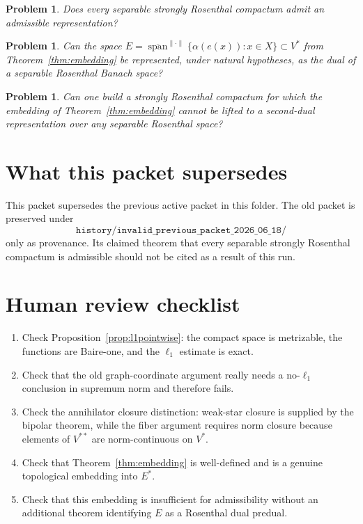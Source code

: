 \documentclass[11pt]{article}
\newtheorem{problem}[theorem]{Problem}
\newcommand{\spancl}{\overline{\operatorname{span}}}
\newcommand{\norm}[1]{\lVert #1\rVert}
\begin{document}
\begin{problem}
Does every separable strongly Rosenthal compactum admit an admissible
representation?
\end{problem}

\begin{problem}
Can the space \(E=\spancl^{\norm{\cdot}}\{\alpha(e(x)):x\in X\}\subset V^*\)
from Theorem~\ref{thm:embedding} be represented, under natural hypotheses, as
the dual of a separable Rosenthal Banach space?
\end{problem}

\begin{problem}
Can one build a strongly Rosenthal compactum for which the embedding of
Theorem~\ref{thm:embedding} cannot be lifted to a second-dual representation
over any separable Rosenthal space?
\end{problem}

\section{What this packet supersedes}

This packet supersedes the previous active packet in this folder.  The old
packet is preserved under
\[
 \texttt{history/invalid\_previous\_packet\_2026\_06\_18/}
\]
only as provenance.  Its claimed theorem that every separable strongly
Rosenthal compactum is admissible should not be cited as a result of this run.

\section{Human review checklist}

\begin{enumerate}[leftmargin=2em]
\item Check Proposition~\ref{prop:l1pointwise}: the compact space is metrizable,
      the functions are Baire-one, and the \(\ell_1\) estimate is exact.
\item Check that the old graph-coordinate argument really needs a
      no-\(\ell_1\) conclusion in supremum norm and therefore fails.
\item Check the annihilator closure distinction:
      weak-star closure is supplied by the bipolar theorem, while the fiber
      argument requires norm closure because elements of \(V^{**}\) are
      norm-continuous on \(V^*\).
\item Check that Theorem~\ref{thm:embedding} is well-defined and is a genuine
      topological embedding into \(E^*\).
\item Check that this embedding is insufficient for admissibility without an
      additional theorem identifying \(E\) as a Rosenthal dual predual.
\end{enumerate}
\end{document}
